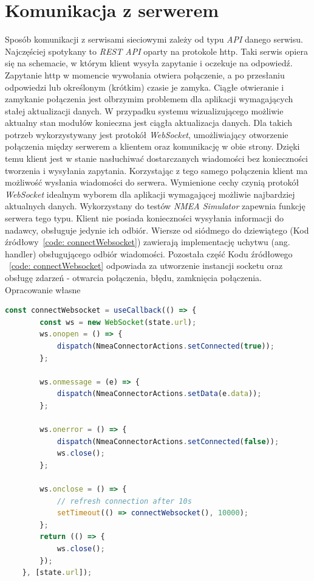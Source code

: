 \documentclass[skorowidz,skroty]{dyplomWEZUT}
\begin{document}
\section{Komunikacja z serwerem}\label{sec: server communication} 
Sposób komunikacji z serwisami sieciowymi zależy od typu \textit{API} danego serwisu. Najczęściej spotykany to \textit{REST API} oparty na protokole http. Taki serwis opiera się na schemacie, w którym klient wysyła zapytanie i oczekuje na odpowiedź. Zapytanie http w momencie wywołania otwiera połączenie, a po przesłaniu odpowiedzi lub określonym (krótkim) czasie je zamyka. Ciągłe otwieranie i zamykanie połączenia jest olbrzymim problemem dla aplikacji wymagających stałej aktualizacji danych. W przypadku systemu wizualizującego możliwie aktualny stan modułów konieczna jest ciągła aktualizacja danych. Dla takich potrzeb wykorzystywany jest protokół \textit{WebSocket}, umożliwiający otworzenie połączenia między serwerem a klientem oraz komunikację w obie strony. Dzięki temu klient jest w stanie nasłuchiwać dostarczanych wiadomości bez konieczności tworzenia i wysyłania zapytania. Korzystając z tego samego połączenia klient ma możliwość wysłania wiadomości do serwera. Wymienione cechy czynią protokół \textit{WebSocket} idealnym wyborem dla aplikacji wymagającej możliwie najbardziej aktualnych danych. Wykorzystany do testów \textit{NMEA Simulator} zapewnia funkcję serwera tego typu. Klient nie posiada konieczności wysyłania informacji do nadawcy, obsługuje jedynie ich odbiór. Wiersze od siódmego do dziewiątego (Kod źródłowy~\ref{code: connectWebsocket}) zawierają implementację uchytwu (ang. handler) obsługującego odbiór wiadomości. Pozostała część Kodu źródłowego ~\ref{code: connectWebsocket} odpowiada za utworzenie instancji socketu oraz obsługę zdarzeń - otwarcia połączenia, błędu, zamknięcia połączenia.
{Opracowanie własne}{\label{code: connectWebsocket}}
\begin{lstlisting}[language=JavaScript]
  const connectWebsocket = useCallback(() => {
        const ws = new WebSocket(state.url);
        ws.onopen = () => {
            dispatch(NmeaConnectorActions.setConnected(true));
        };

        ws.onmessage = (e) => {
            dispatch(NmeaConnectorActions.setData(e.data));
        };

        ws.onerror = () => {
            dispatch(NmeaConnectorActions.setConnected(false));
            ws.close();
        };

        ws.onclose = () => {
            // refresh connection after 10s
            setTimeout(() => connectWebsocket(), 10000);
        };
        return (() => {
            ws.close();
        });
    }, [state.url]);    
    
\end{lstlisting}
\end{document}

